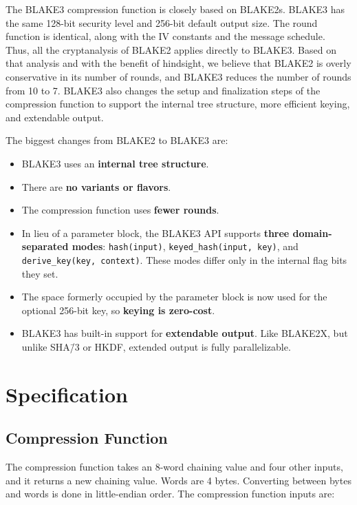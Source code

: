 \documentclass[11pt,notitlepage,a4paper]{article}
\begin{document}
The BLAKE3 compression function is closely based on BLAKE2s. BLAKE3 has the
same 128-bit security level and 256-bit default output size. The round function
is identical, along with the IV constants and the message schedule. Thus, all
the cryptanalysis of BLAKE2 applies directly to BLAKE3. Based on that analysis
and with the benefit of hindsight, we believe that BLAKE2 is overly
conservative in its number of rounds, and BLAKE3 reduces the number of rounds
from 10 to 7. BLAKE3 also changes the setup and finalization steps of the
compression function to support the internal tree structure, more efficient
keying, and extendable output.

The biggest changes from BLAKE2 to BLAKE3 are:

\begin{itemize}
    \item BLAKE3 uses an \textbf{internal tree structure}.
    \item There are \textbf{no variants or flavors}.
    \item The compression function uses \textbf{fewer rounds}.
    \item In lieu of a parameter block, the BLAKE3 API supports \textbf{three
        domain-separated modes}: \texttt{hash(input)},
        \texttt{keyed\_hash(input, key)}, and \texttt{derive\_key(key,
        context)}. These modes differ only in the internal flag bits they set.
    \item The space formerly occupied by the parameter block is now used for
        the optional 256-bit key, so \textbf{keying is zero-cost}.
    \item BLAKE3 has built-in support for \textbf{extendable output}. Like
        BLAKE2X, but unlike SHA\=/3 or HKDF, extended output is fully
        parallelizable.
\end{itemize}

\section{Specification}\label{sec:specification}

\subsection{Compression Function}\label{sec:compression}

The compression function takes an 8-word chaining value and four other inputs,
and it returns a new chaining value. Words are 4 bytes. Converting between
bytes and words is done in little-endian order. The compression function inputs
are:
\end{document}
